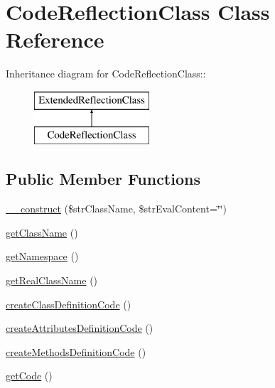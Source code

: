 \hypertarget{class_code_reflection_class}{
\section{CodeReflectionClass Class Reference}
\label{class_code_reflection_class}
}
Inheritance diagram for CodeReflectionClass::\begin{figure}[H]
\begin{center}
\leavevmode
\includegraphics[height=2cm]{class_code_reflection_class}
\end{center}
\end{figure}
\subsection*{Public Member Functions}
\begin{CompactItemize}
\item 
\hyperlink{class_code_reflection_class_547ea2461cf205c8fa25418294c0980d}{\_\-\_\-construct} (\$strClassName, \$strEvalContent=\char`\"{}\char`\"{})
\item 
\hyperlink{class_code_reflection_class_301551243100b6815a25631e0a51bbbd}{getClassName} ()
\item 
\hyperlink{class_code_reflection_class_b06f3f9c77e5de60c88b6afe05fc7ce3}{getNamespace} ()
\item 
\hyperlink{class_code_reflection_class_d4192b5d48919ca2cd5ef72db74a8ad5}{getRealClassName} ()
\item 
\hyperlink{class_code_reflection_class_a7ab3478fc4d4d35708852357cfaddc7}{createClassDefinitionCode} ()
\item 
\hyperlink{class_code_reflection_class_4bf8009246a6e2c63ff61c6c2098fbf9}{createAttributesDefinitionCode} ()
\item 
\hyperlink{class_code_reflection_class_d5281e9b818a323b080cbc8fa9a07365}{createMethodsDefinitionCode} ()
\item 
\hyperlink{class_code_reflection_class_7a387d50344d14a25fbccf5e653f9312}{getCode} ()
\end{CompactItemize}
